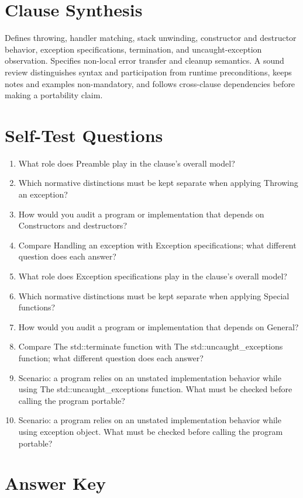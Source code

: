 \documentclass[11pt,letterpaper]{article}
\begin{document}
\section{Clause Synthesis}
\begin{CornellReferenceOrientationBox}Defines throwing, handler matching, stack unwinding, constructor and destructor behavior, exception specifications, termination, and uncaught-exception observation. Specifies non-local error transfer and cleanup semantics. A sound review distinguishes syntax and participation from runtime preconditions, keeps notes and examples non-mandatory, and follows cross-clause dependencies before making a portability claim.\end{CornellReferenceOrientationBox}
\section{Self-Test Questions}
\begin{enumerate}
\item What role does Preamble play in the clause's overall model?
\item Which normative distinctions must be kept separate when applying Throwing an exception?
\item How would you audit a program or implementation that depends on Constructors and destructors?
\item Compare Handling an exception with Exception specifications; what different question does each answer?
\item What role does Exception specifications play in the clause's overall model?
\item Which normative distinctions must be kept separate when applying Special functions?
\item How would you audit a program or implementation that depends on General?
\item Compare The std::terminate function with The std::uncaught\_\allowbreak{}exceptions function; what different question does each answer?
\item Scenario: a program relies on an unstated implementation behavior while using The std::uncaught\_\allowbreak{}exceptions function. What must be checked before calling the program portable?
\item Scenario: a program relies on an unstated implementation behavior while using exception object. What must be checked before calling the program portable?
\end{enumerate}
\clearpage\section{Answer Key}
\end{document}
